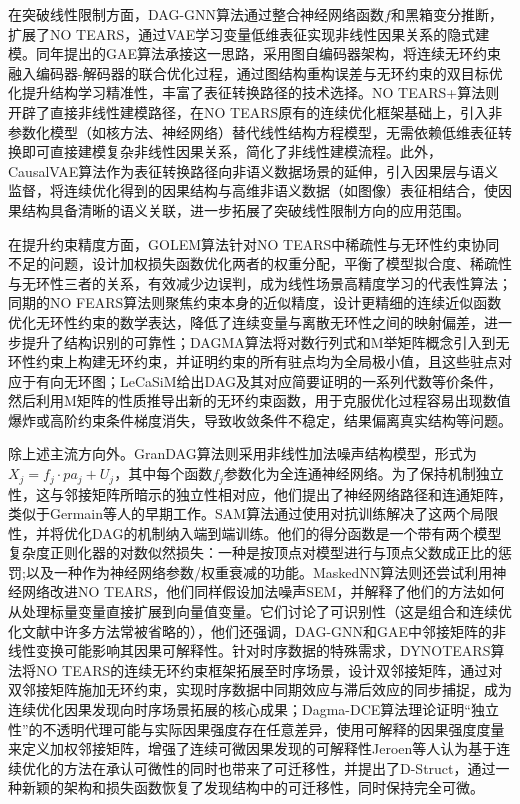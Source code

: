 在突破线性限制方面，DAG-GNN算法\cite{Yu2019}通过整合神经网络函数$f$和黑箱变分推断，扩展了NO TEARS，通过VAE学习变量低维表征实现非线性因果关系的隐式建模。同年提出的GAE算法\cite{Ng2019}承接这一思路，采用图自编码器架构，将连续无环约束融入编码器-解码器的联合优化过程，通过图结构重构误差与无环约束的双目标优化提升结构学习精准性，丰富了表征转换路径的技术选择。NO TEARS+算法\cite{Zheng2020a}则开辟了直接非线性建模路径，在NO TEARS原有的连续优化框架基础上，引入非参数化模型（如核方法、神经网络）替代线性结构方程模型，无需依赖低维表征转换即可直接建模复杂非线性因果关系，简化了非线性建模流程。此外，CausalVAE算法\cite{Yang2021}作为表征转换路径向非语义数据场景的延伸，引入因果层与语义监督，将连续优化得到的因果结构与高维非语义数据（如图像）表征相结合，使因果结构具备清晰的语义关联，进一步拓展了突破线性限制方向的应用范围。

在提升约束精度方面，GOLEM算法\cite{Ng2020}针对NO TEARS中稀疏性与无环性约束协同不足的问题，设计加权损失函数优化两者的权重分配，平衡了模型拟合度、稀疏性与无环性三者的关系，有效减少边误判，成为线性场景高精度学习的代表性算法；同期的NO FEARS算法\cite{Wei2020}则聚焦约束本身的近似精度，设计更精细的连续近似函数优化无环性约束的数学表达，降低了连续变量与离散无环性之间的映射偏差，进一步提升了结构识别的可靠性；DAGMA算法\cite{Bello2022}将对数行列式和M举矩阵概念引入到无环性约束上构建无环约束，并证明约束的所有驻点均为全局极小值，且这些驻点对应于有向无环图；LeCaSiM\cite{Cai2024}给出DAG及其对应简要证明的一系列代数等价条件，然后利用M矩阵的性质推导出新的无环约束函数，用于克服优化过程容易出现数值爆炸或高阶约束条件梯度消失，导致收敛条件不稳定，结果偏离真实结构等问题。

除上述主流方向外。GranDAG算法\cite{Lachapelle2020}则采用非线性加法噪声结构模型，形式为$X_j = f_j \cdot pa_j+ U_j$，其中每个函数$ f_j $参数化为全连通神经网络。为了保持机制独立性，这与邻接矩阵所暗示的独立性相对应，他们提出了神经网络路径和连通矩阵，类似于Germain等人\cite{Germain2015}的早期工作。SAM算法\cite{Kalainathan2022}通过使用对抗训练解决了这两个局限性，并将优化DAG的机制纳入端到端训练。他们的得分函数是一个带有两个模型复杂度正则化器的对数似然损失：一种是按顶点对模型进行与顶点父数成正比的惩罚;以及一种作为神经网络参数/权重衰减的功能。MaskedNN算法\cite{Ng2022}则还尝试利用神经网络改进NO TEARS，他们同样假设加法噪声SEM，并解释了他们的方法如何从处理标量变量直接扩展到向量值变量。它们讨论了可识别性（这是组合和连续优化文献中许多方法常被省略的），他们还强调，DAG-GNN和GAE中邻接矩阵的非线性变换可能影响其因果可解释性。针对时序数据的特殊需求，DYNOTEARS算法\cite{Pamfil2020}将NO TEARS的连续无环约束框架拓展至时序场景，设计双邻接矩阵，通过对双邻接矩阵施加无环约束，实现时序数据中同期效应与滞后效应的同步捕捉，成为连续优化因果发现向时序场景拓展的核心成果；Dagma-DCE算法\cite{Waxman2024}理论证明“独立性”的不透明代理可能与实际因果强度存在任意差异，使用可解释的因果强度度量来定义加权邻接矩阵，增强了连续可微因果发现的可解释性Jeroen等人\cite{Berrevoets2023}认为基于连续优化的方法在承认可微性的同时也带来了可迁移性，并提出了D\mbox{-}Struct，通过一种新颖的架构和损失函数恢复了发现结构中的可迁移性，同时保持完全可微。

